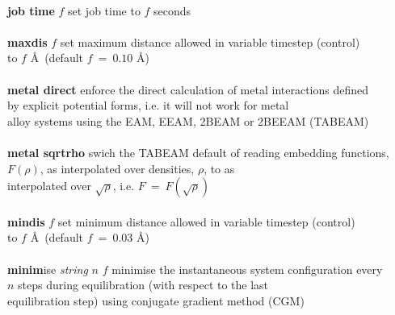 \begin{tabbing}
\>                                              \> \\
\> {\bf job time} $f$                           \> set job time to $f$ seconds \\
\>                                              \> \\
\> {\bf maxdis} $f$                             \> set maximum distance allowed in variable timestep (control) \\
\>                                              \> to $f$ \AA~(default $f~=~0.10$ \AA) \\
\>                                              \> \\
\> {\bf metal direct}                           \> enforce the direct calculation of metal interactions defined \\
\>                                              \> by explicit potential forms, i.e. it will not work for metal \\
\>                                              \> alloy systems using the EAM, EEAM, 2BEAM or 2BEEAM (TABEAM) \\
\>                                              \> \\
\> {\bf metal sqrtrho}                          \> swich the TABEAM default of reading embedding functions, \\
\>                                              \> $F(\rho)$, as interpolated over densities, $\rho$, to as \\
\>                                              \> interpolated over $\sqrt{\rho}$, i.e. $F~=~F(\sqrt{\rho})$\\
\>                                              \> \\
\> {\bf mindis} $f$                             \> set minimum distance allowed in variable timestep (control) \\
\>                                              \> to $f$ \AA~(default $f~=~0.03$ \AA) \\
\>                                              \> \\
\> {\bf minim}ise {\em string} $n$ $f$          \> minimise the instantaneous system configuration every \\
\>                                              \> $n$ steps during equilibration (with respect to the last \\
\>                                              \> equilibration step) using conjugate gradient method (CGM) \\

\end{tabbing}
